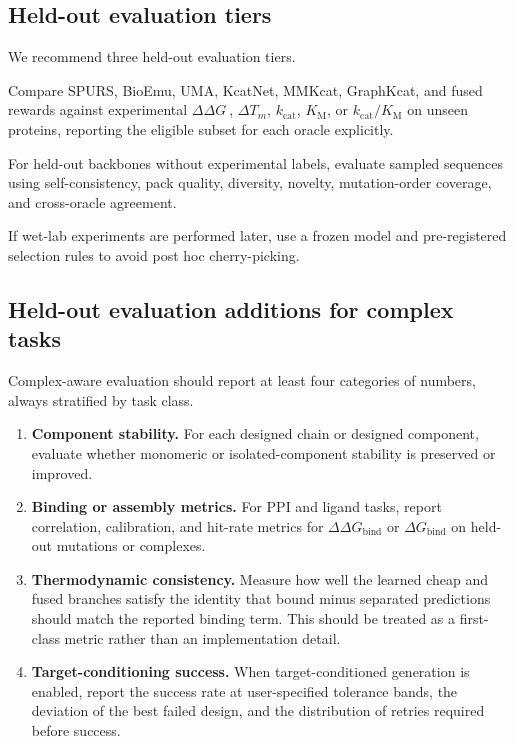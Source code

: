 \documentclass[11pt]{article}
\newcommand{\ddG}{\ensuremath{\Delta\Delta G \ }}
\newcommand{\kcat}{\ensuremath{k_{\mathrm{cat}}}}
\newcommand{\Km}{\ensuremath{K_{\mathrm M}}}
\newcommand{\kcatKm}{\ensuremath{k_{\mathrm{cat}}/K_{\mathrm M}}}
\newcommand{\DGbind}{\ensuremath{\Delta G_{\mathrm{bind}}}}
\newcommand{\DDGbind}{\ensuremath{\Delta\Delta G_{\mathrm{bind}}}}
\begin{document}
	\subsection{Held-out evaluation tiers}
	
	We recommend three held-out evaluation tiers.
	\begin{description}[leftmargin=1.5em,style=nextline]
		\item[Tier 1: oracle validation.] Compare SPURS, BioEmu, UMA, KcatNet, MMKcat, GraphKcat, and fused rewards against experimental \ddG, $\Delta T_m$, $\kcat$, $\Km$, or $\kcatKm$ on unseen proteins, reporting the eligible subset for each oracle explicitly.
		\item[Tier 2: design validation.] For held-out backbones without experimental labels, evaluate sampled sequences using self-consistency, pack quality, diversity, novelty, mutation-order coverage, and cross-oracle agreement.
		\item[Tier 3: experimental shortlist.] If wet-lab experiments are performed later, use a frozen model and pre-registered selection rules to avoid post hoc cherry-picking.
	\end{description}
	
	
	
	\subsection{Held-out evaluation additions for complex tasks}
	
	Complex-aware evaluation should report at least four categories of numbers, always stratified by task class.
	\begin{enumerate}[leftmargin=1.5em]
		\item \textbf{Component stability.} For each designed chain or designed component, evaluate whether monomeric or isolated-component stability is preserved or improved.
		\item \textbf{Binding or assembly metrics.} For PPI and ligand tasks, report correlation, calibration, and hit-rate metrics for \DDGbind{} or \DGbind{} on held-out mutations or complexes.
		\item \textbf{Thermodynamic consistency.} Measure how well the learned cheap and fused branches satisfy the identity that bound minus separated predictions should match the reported binding term. This should be treated as a first-class metric rather than an implementation detail.
		\item \textbf{Target-conditioning success.} When target-conditioned generation is enabled, report the success rate at user-specified tolerance bands, the deviation of the best failed design, and the distribution of retries required before success.
	\end{enumerate}
	
\end{document}
